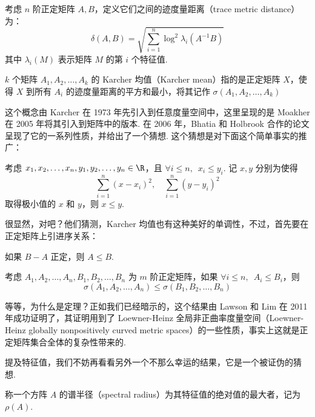 \begin{definition}
    考虑 $n$ 阶正定矩阵 $A, B$，定义它们之间的迹度量距离（trace metric distance）为：
    \[ \delta(A, B) = \sqrt{\sum_{i = 1}^n \log^2\lambda_i(A^{-1}B)} \]
    其中 $\lambda_i(M)$ 表示矩阵 $M$ 的第 $i$ 个特征值.
\end{definition}

\begin{definition}
    $k$ 个矩阵 $A_1, A_2, \ldots, A_k$ 的 Karcher 均值（Karcher mean）指的是正定矩阵 $X$，使得 $X$ 到所有 $A_i$ 的迹度量距离的平方和最小，将其记作 $\sigma(A_1, A_2, \ldots, A_k)$
\end{definition}

这个概念由 Karcher 在 1973 年先引入到任意度量空间中，这里呈现的是 Moakher 在 2005 年将其引入到矩阵中的版本. 在 2006 年，Bhatia 和 Holbrook 合作的论文呈现了它的一系列性质，并给出了一个猜想. 这个猜想是对下面这个简单事实的推广：

\begin{lemma}
    考虑 $x_1, x_2, \ldots, x_n, y_1, y_2, \ldots, y_n \in \R$，且 $\forall i \leqslant n,\enspace x_i \leqslant y_i$. 记 $x, y$ 分别为使得
    \[ \sum_{i = 1}^n (x - x_i)^2, \quad \sum_{i = 1}^n (y - y_i)^2 \]
    取得极小值的 $x$ 和 $y$，则 $x \leqslant y$.
\end{lemma}

很显然，对吧？他们猜测，Karcher 均值也有这种美好的单调性，不过，首先要在正定矩阵上引进序关系：

\begin{definition}
    如果 $B - A$ 正定，则 $A \leqslant B$.
\end{definition}

\begin{theorem}
    考虑 $A_1, A_2, \ldots, A_n, B_1, B_2, \ldots, B_n$ 为 $m$ 阶正定矩阵，如果 $\forall i \leqslant n,\enspace A_i \leqslant B_i$，则
    \[ \sigma(A_1, A_2, \ldots, A_n) \leqslant \sigma(B_1, B_2, \ldots, B_n) \]
\end{theorem}

等等，为什么是定理？正如我们已经暗示的，这个结果由 Lawson 和 Lim 在 2011 年成功证明了，其证明用到了 Loewner-Heinz 全局非正曲率度量空间（Loewner-Heinz globally nonpositively curved metric spaces）的一些性质，事实上这就是正定矩阵集合全体的复杂性带来的.

提及特征值，我们不妨再看看另外一个不那么幸运的结果，它是一个被证伪的猜想.

\begin{definition}
    称一个方阵 $A$ 的谱半径（spectral radius）为其特征值的绝对值的最大者，记为 $\rho(A)$.
\end{definition}


